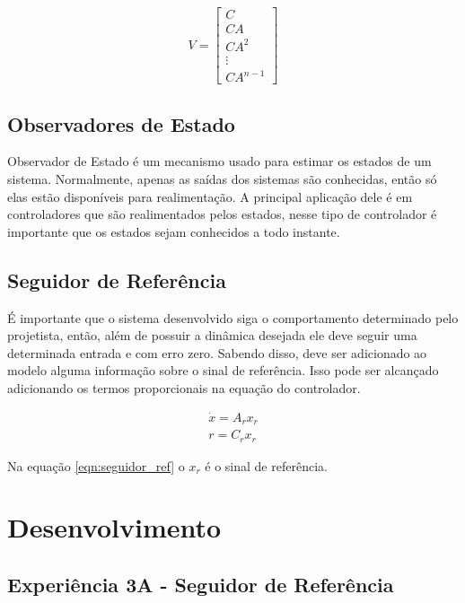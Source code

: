 \documentclass[
	12pt,				%
	openany,			%
	oneside,			%
	a4paper,			%
	english,			%
	french,				%
	spanish,			%
	brazil,				%
	]{abntex2}
\begin{document}
{\begin{equation}
V =
\begin{bmatrix}
	C\\
	CA\\
	CA^2\\
	\vdots \\
	CA^{n-1}
\end{bmatrix}
\end{equation}

\section{Observadores de Estado}

Observador de Estado é um mecanismo usado para estimar os estados de um sistema. Normalmente, apenas as saídas dos sistemas são conhecidas, então só elas estão disponíveis para realimentação. A principal aplicação dele é em controladores que são realimentados pelos estados, nesse tipo de controlador é importante que os estados sejam conhecidos a todo instante.

\section{Seguidor de Referência}

É importante que o sistema desenvolvido siga o comportamento determinado pelo projetista, então, além de possuir a dinâmica desejada ele deve seguir uma determinada entrada e com erro zero. Sabendo disso, deve ser adicionado ao modelo alguma informação sobre o sinal de referência. Isso pode ser alcançado adicionando os termos proporcionais na equação do controlador. 

\begin{equation}
	\begin{split}
	\dot{x} = A_r x_r \\ 
    r = C_r x_r
	\end{split}
    \label{eqn:seguidor_ref}
\end{equation}

Na equação \ref{eqn:seguidor_ref} o $x_r$ é o sinal de referência.

\chapter{Desenvolvimento}

\section{Experiência 3A - Seguidor de Referência}

}
\end{document}
